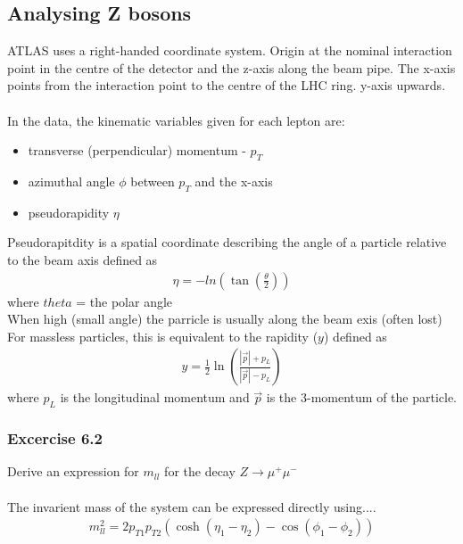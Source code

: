 \documentclass[11pt]{article}
\newcommand{\<}{\guilsinglleft}
\renewcommand{\>}{\guilsinglright}
\begin{document}
    \subsection{Analysing Z bosons}

    ATLAS uses a right-handed coordinate system.
    Origin at the nominal interaction point in the centre of the detector and the z-axis along the beam pipe.
    The x-axis points from the interaction point to the centre of the LHC ring.
    y-axis upwards.
    \\\\
    In the data, the kinematic variables given for each lepton are:
    \begin{itemize}
        \item transverse (perpendicular) momentum - $p_T$
        \item azimuthal angle $\phi$ between $p_T$ and the x-axis
        \item pseudorapidity $\eta$
    \end{itemize}
    Pseudorapitdity is a spatial coordinate describing the angle of a particle relative to the beam axis defined as
    \begin{align}
        \eta = -ln \left( \tan\left( \frac{\theta}{2} \right) \right)
    \end{align}
    where $theta$ = the polar angle\\
    When high (small angle) the parricle is usually along the beam exis (often lost)
    For massless particles, this is equivalent to the rapidity ($y$) defined as
    \begin{align}
        y = \frac{1}{2}  \ln \left( \frac{|\vec{p}| + p_L}{|\vec{p}| - p_L} \right)
    \end{align}
    where $p_L$ is the longitudinal momentum and $\vec{p}$ is  the 3-momentum of the particle.


    \subsubsection{Excercise 6.2}
    Derive an expression for $m_{ll}$ for the decay $Z \rightarrow \mu^+ \mu^-$
    \\\\
    The invarient mass of the system can be expressed directly using....
    \begin{align}
        m_{ll}^2 = 2 p_{T1} p_{T2} \left( \cosh (\eta_1 - \eta_2) - \cos(\phi_1 - \phi_2) \right)
    \end{align}
    
\end{document}
